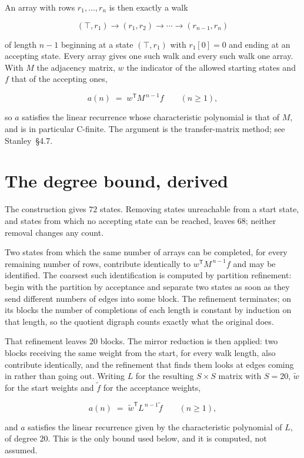 \documentclass[11pt]{article}
\theoremstyle{definition}
\begin{document}
An array with rows $r_1,\dots,r_n$ is then exactly a walk

\[(\top,r_1) \to (r_1,r_2) \to \cdots \to (r_{n-1},r_n)\]

of length $n-1$ beginning at a state $(\top,r_1)$ with $r_1[0]=0$ and ending at an accepting state. Every array gives one such walk and every such walk one array. With $M$ the adjacency matrix, $w$ the indicator of the allowed starting states and $f$ that of the accepting ones,

\[a(n) \;=\; w^{\mathsf T} M^{\,n-1} f \qquad (n \ge 1),\]

so $a$ satisfies the linear recurrence whose characteristic polynomial is that of $M$, and is in particular C-finite. The argument is the transfer-matrix method; see Stanley~\S4.7.

\section{The degree bound, derived}

The construction gives $72$ states. Removing states unreachable from a start state, and states from which no accepting state can be reached, leaves $68$; neither removal changes any count.

Two states from which the same number of arrays can be completed, for every remaining number of rows, contribute identically to $w^{\mathsf T}M^{\,n-1}f$ and may be identified. The coarsest such identification is computed by partition refinement: begin with the partition by acceptance and separate two states as soon as they send different numbers of edges into some block. The refinement terminates; on its blocks the number of completions of each length is constant by induction on that length, so the quotient digraph counts exactly what the original does.

That refinement leaves $20$ blocks. The mirror reduction is then applied: two blocks receiving the same weight from the start, for every walk length, also contribute identically, and the refinement that finds them looks at edges coming in rather than going out. Writing $L$ for the resulting $S \times S$ matrix with $S = 20$, $\tilde w$ for the start weights and $\tilde f$ for the acceptance weights,

\[a(n) \;=\; \tilde w^{\mathsf T} L^{\,n-1} \tilde f \qquad (n \ge 1),\]

and $a$ satisfies the linear recurrence given by the characteristic polynomial of $L$, of degree $20$. This is the only bound used below, and it is computed, not assumed.
\end{document}
